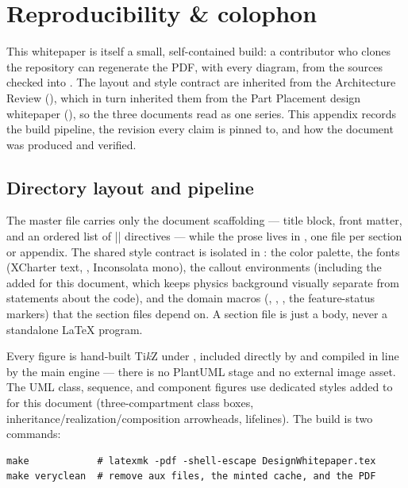 \section{Reproducibility \& colophon}\label{app:repro}

This whitepaper is itself a small, self-contained build: a contributor who clones the
repository can regenerate the PDF, with every diagram, from the sources checked into
. The layout and style contract are inherited from the
Architecture Review (), which in turn inherited them
from the Part Placement design whitepaper (), so the
three documents read as one series. This appendix records the build pipeline, the
revision every claim is pinned to, and how the document was produced and verified.

\subsection{Directory layout and pipeline}

The master file  carries only the document scaffolding ---
title block, front matter, and an ordered list of \cppinline|| directives --- while
the prose lives in , one file per section or appendix. The shared style
contract is isolated in : the color palette, the fonts (XCharter text,
, Inconsolata mono), the callout environments (including the
 added for this document, which keeps physics background visually separate
from statements about the code), and the domain macros (,
, , the feature-status markers)
that the section files depend on. A section file is just a body, never a standalone
\LaTeX{} program.

Every figure is hand-built Ti\emph{k}Z under , included directly by
 and compiled in line by the main engine --- there is no
PlantUML stage and no external image asset. The UML class, sequence, and component
figures use dedicated styles added to  for this document
(three-compartment class boxes, inheritance/realization/composition arrowheads,
lifelines). The build is two commands:

\begin{verbatim}
make            # latexmk -pdf -shell-escape DesignWhitepaper.tex
make veryclean  # remove aux files, the minted cache, and the PDF
\end{verbatim}

